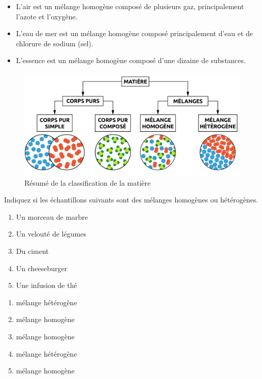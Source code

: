 \documentclass[
  11pt,
  a4paper,
  openany]{book}
\providecommand{\tightlist}{%
  \setlength{\itemsep}{0pt}\setlength{\parskip}{0pt}}
\begin{document}
\begin{itemize}
\tightlist
\item
  L'air est un mélange homogène composé de plusieurs gaz, principalement l'azote et l'oxygène.
\item
  L'eau de mer est un mélange homogène composé principalement d'eau et de chlorure de sodium (sel).
\item
  L'essence est un mélange homogène composé d'une dizaine de substances.
\end{itemize}

\begin{figure}

{\centering \includegraphics[width=0.67\linewidth]{images/schema-matiere} 

}

\caption{Résumé de la classification de la matière}\label{fig:schema-matiere}
\end{figure}

\begin{Exercise}

Indiquez si les échantillons suivants sont des mélanges homogènes ou hétérogènes.

\begin{enumerate}
\def\labelenumi{\arabic{enumi}.}
\tightlist
\item
  Un morceau de marbre
\item
  Un velouté de légumes
\item
  Du ciment
\item
  Un cheeseburger
\item
  Une infusion de thé
\end{enumerate}

\end{Exercise}

\begin{Answer}

\begin{enumerate}
\def\labelenumi{\arabic{enumi}.}
\tightlist
\item
  mélange hétérogène
\item
  mélange homogène
\item
  mélange homogène
\item
  mélange hétérogène
\item
  mélange homogène
\end{enumerate}

\end{Answer}
\end{document}
